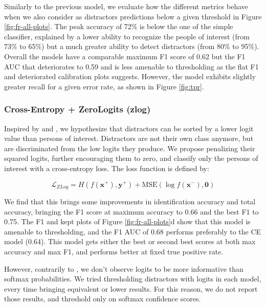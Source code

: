 Similarly to the previous model, we evaluate how the different metrics behave when we also consider as distractors predictions below a given threshold in Figure \ref{fig:fr-all-plots}. The peak accuracy of 72\% is below the one of the simple classifier, explained by a lower ability to recognize the people of interest (from 73\% to 65\%) but a much greater ability to detect distractors (from 80\% to 95\%). Overall the models have a comparable maximum F1 score of 0.62 but the F1 \ac{AUC} that deteriorates to 0.59 and is less amenable to thresholding as the flat F1 and deteriorated calibration plots suggests. However, the model exhibits slightly greater recall for a given error rate, as shown in Figure \ref{fig:tpr}.

\subsubsection{Cross-Entropy + ZeroLogits (zlog)}

Inspired by \citet{goodosr} and \cite{l2softmax}, we hypothesize that distractors can be sorted by a lower logit value than persons of interest. Distractors are not their own class anymore, but are discriminated from the low logits they produce. We propose penalizing their squared logits, further encouraging them to zero, and classify only the persons of interest with a cross-entropy loss.  The loss function is defined by:

\begin{equation}
    \mathcal{L}_{ZLog} = H(f(\mathbf{x}^+), \mathbf{y}^+) + \text{MSE}(\log f(\mathbf{x}^-), \mathbf{0})
\end{equation}

We find that this brings some improvements in identification accuracy and total accuracy, bringing the F1 score at maximum accuracy to 0.66 and the best F1 to 0.75. The F1 and kept plots of Figure \ref{fig:fr-all-plots}d show that this model is amenable to thresholding, and the F1 AUC of 0.68 performs preferably to the CE model (0.64). This model gets either the best or second best scores at both max accuracy and max F1, and performs better at fixed true positive rate.

However, contrarily to \citet{goodosr}, we don't observe logits to be more informative than softmax probabilities. We tried thresholding distractors with logits in each model, every time bringing equivalent or lower results. For this reason, we do not report those results, and threshold only on softmax confidence scores.

